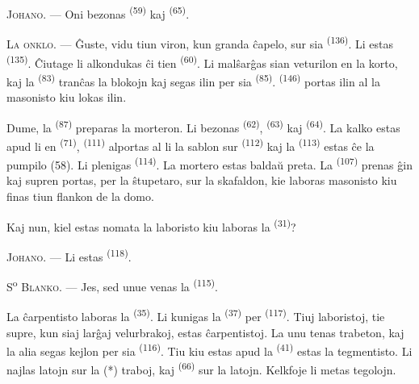 \textsc{Johano}. --- Oni bezonas  \textsuperscript{(59)} kaj
 \textsuperscript{(65)}.

\textsc{La onklo}. --- Ĝuste, vidu tiun viron, kun granda ĉapelo, sur sia
 \textsuperscript{(136)}. Li estas 
\textsuperscript{(135)}. Ĉiutage li alkondukas ĉi tien 
\textsuperscript{(60)}. Li malŝarĝas sian veturilon en la korto, kaj la
 \textsuperscript{(83)} tranĉas la blokojn kaj segas
ilin per sia  \textsuperscript{(85)}.
 \textsuperscript{(146)} portas ilin al la masonisto kiu
lokas ilin.

Dume, la  \textsuperscript{(87)} preparas la morteron. Li
bezonas  \textsuperscript{(62)}, 
\textsuperscript{(63)} kaj  \textsuperscript{(64)}. La kalko
estas apud li en  \textsuperscript{(71)}, 
\textsuperscript{(111)} alportas al li la sablon sur 
\textsuperscript{(112)} kaj la  \textsuperscript{(113)}
estas ĉe la pumpilo (58). Li plenigas  \textsuperscript{(114)}.
La mortero estas baldaŭ preta. La 
\textsuperscript{(107)} prenas ĝin kaj supren portas, per la ŝtupetaro, sur la
skafaldon, kie laboras masonisto kiu finas tiun flankon de la domo.

Kaj nun, kiel estas nomata la laboristo kiu laboras la 
\textsuperscript{(31)}?

\textsc{Johano}. --- Li estas  \textsuperscript{(118)}.

\VUsaut{3.0mm}
\VUsaut{3.0mm}

S\textsuperscript{o} \textsc{Blanko}. --- Jes, sed unue venas la
 \textsuperscript{(115)}.

La ĉarpentisto laboras la  \textsuperscript{(35)}. Li
kunigas la  \textsuperscript{(37)} per 
\textsuperscript{(117)}. Tiuj laboristoj, tie supre, kun siaj larĝaj velurbrakoj,
estas ĉarpentistoj. La unu tenas trabeton, kaj la alia segas kejlon per sia
 \textsuperscript{(116)}. Tiu kiu estas apud la
 \textsuperscript{(41)} estas la tegmentisto. Li najlas latojn
sur la (*) traboj, kaj  \textsuperscript{(66)} sur la latojn.
Kelkfoje li metas tegolojn.


